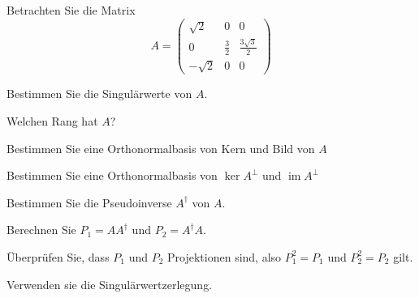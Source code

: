 Betrachten Sie die Matrix
\[
A=
\begin{pmatrix}
\sqrt{2} & 0 & 0 \\
0 & \frac32 & \frac{3\sqrt{3}}2 \\
-\sqrt{2} & 0 & 0
\end{pmatrix}
\]
\begin{teilaufgaben}
\item Bestimmen Sie die Singulärwerte von $A$.
\item Welchen Rang hat $A$?
\item Bestimmen Sie eine Orthonormalbasis von Kern und Bild von $A$
\item Bestimmen Sie eine Orthonormalbasis von $\operatorname{ker}A^\perp$
und $\operatorname{im}A^\perp$
\item Bestimmen Sie die Pseudoinverse $A^\dagger$ von $A$.
\item Berechnen Sie $P_1=AA^\dagger$ und $P_2=A^\dagger A$.
\item Überprüfen Sie, dass $P_1$ und $P_2$ Projektionen sind, also
$P_1^2=P_1$ und $P_2^2=P_2$ gilt.
\end{teilaufgaben}

\begin{hinweis}
Verwenden sie die Singulärwertzerlegung.
\end{hinweis}


